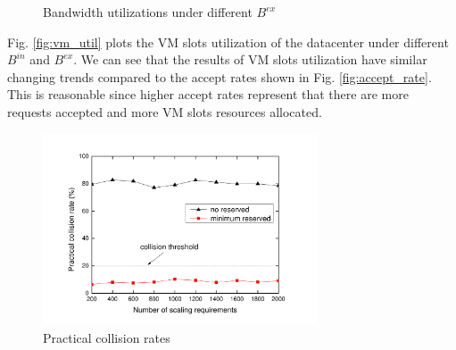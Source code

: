 \documentclass[review]{elsarticle}
\begin{document}
\begin{figure}[H]
	\centering
	\caption{Bandwidth utilizations under different $B^{ex}$}
	\label{fig:bw_util}
\end{figure}

Fig. \ref{fig:vm_util} plots the VM slots utilization of the datacenter under different $B^{in}$ and $B^{ex}$. We can see that the results of VM slots utilization have similar changing trends compared to the accept rates shown in Fig. \ref{fig:accept_rate}.
This is reasonable since higher accept rates represent that there are more requests accepted and more VM slots resources allocated.  

\begin{figure}[H]
	\centering
	\includegraphics[width=3.2in]{fig/collision_rate_num.pdf}
	\caption{Practical collision rates}
	\label{fig:collision_rate_num}
\end{figure}
\end{document}

